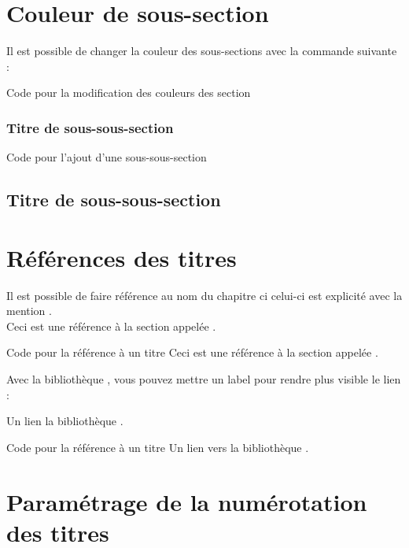 {\section{Couleur de sous-section}

Il est possible de changer la couleur des sous-sections avec la commande suivante : \\

\begin{Latex}{Code pour la modification des couleurs des section}
\end{Latex}


\subsubsection{Titre de sous-sous-section}
\begin{Latex}{Code pour l'ajout d'une sous-sous-section}
\subsection{Titre de sous-sous-section}
\end{Latex}


\section{Références des titres}

Il est possible de faire référence au nom du chapitre ci celui-ci est explicité avec la mention .\\

Ceci est une référence à la section appelée .\\

\begin{Latex}{Code pour la référence à un titre}
Ceci est une référence à la section appelée .
\end{Latex}

Avec la bibliothèque , vous pouvez mettre un label pour rendre plus visible le lien : 

Un lien la bibliothèque .

\begin{Latex}{Code pour la référence à un titre}
Un lien vers la bibliothèque .
\end{Latex}

\section{Paramétrage de la numérotation des titres}

}
